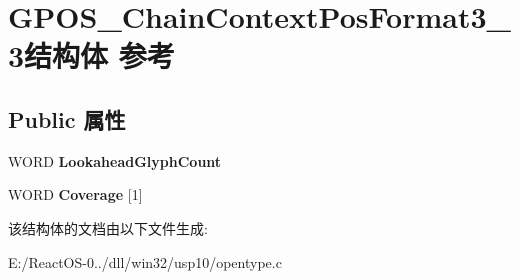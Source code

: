 \hypertarget{struct_g_p_o_s___chain_context_pos_format3__3}{}\section{G\+P\+O\+S\+\_\+\+Chain\+Context\+Pos\+Format3\+\_\+3结构体 参考}
\label{struct_g_p_o_s___chain_context_pos_format3__3}
\subsection*{Public 属性}
\begin{DoxyCompactItemize}
\item 
\mbox{\label{struct_g_p_o_s___chain_context_pos_format3__3_a3287d18905eea79f90a7be64ecf5161b}} 
W\+O\+RD {\bfseries Lookahead\+Glyph\+Count}
\item 
\mbox{\label{struct_g_p_o_s___chain_context_pos_format3__3_a2a6036ff0db9a50c35457b3caf543843}} 
W\+O\+RD {\bfseries Coverage} \mbox{[}1\mbox{]}
\end{DoxyCompactItemize}


该结构体的文档由以下文件生成\+:\begin{DoxyCompactItemize}
\item 
E\+:/\+React\+O\+S-\/0../dll/win32/usp10/opentype.\+c\end{DoxyCompactItemize}
